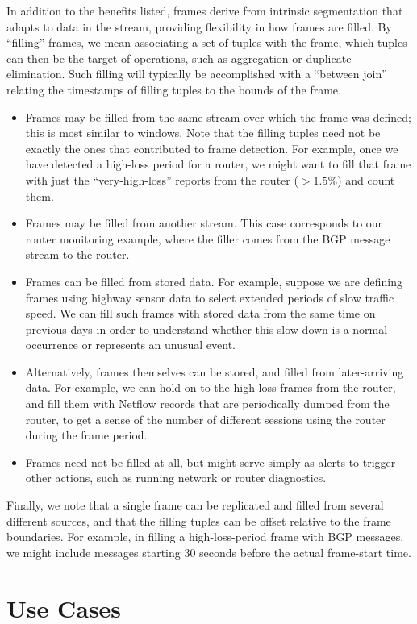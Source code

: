 \documentclass{vldb}
\newcommand{\dquote}[1]{``#1''}
\begin{document}
In addition to the benefits listed, frames derive from intrinsic segmentation that adapts to data in the stream, providing flexibility in how frames are filled. By \dquote{filling} frames, we mean associating a set of tuples with the frame, which tuples can then be the target of operations, such as aggregation or duplicate elimination. Such filling will typically be accomplished with a \dquote{between join} relating the timestamps of filling tuples to the bounds of the frame. 
%
\begin{itemize}
\item Frames may be filled from the same stream over which the frame was defined; this is most similar to windows. Note that the filling tuples need not be exactly the ones that contributed to frame detection. For example, once we have detected a high-loss period for a router, we might want to fill that frame with just the \dquote{very-high-loss} reports from the router ($> 1.5\%$) and count them.
\item Frames may be filled from another stream. This case corresponds to our router monitoring example, where the filler comes from the BGP message stream to the router.
\item Frames can be filled from stored data. For example, suppose we are defining frames using highway sensor data to select extended periods of slow traffic speed. We can fill such frames with stored data from the same time on previous days in order to understand whether this slow down is a normal occurrence or represents an unusual event.
\item Alternatively, frames themselves can be stored, and filled from later-arriving data. For example, we can hold on to the high-loss frames from the router, and fill them with Netflow records that are periodically dumped from the router, to get a sense of the number of different sessions using the router during the frame period.
\item Frames need not be filled at all, but might serve simply as alerts to trigger other actions, such as running network or router diagnostics.
\end{itemize}

Finally, we note that a single frame can be replicated and filled from several different sources, and that the filling tuples can be offset relative to the frame boundaries. For example, in filling a high-loss-period frame with BGP messages, we might include messages starting 30 seconds before the actual frame-start time.

\section{Use Cases}
\label{sec:usecases}
\end{document}
